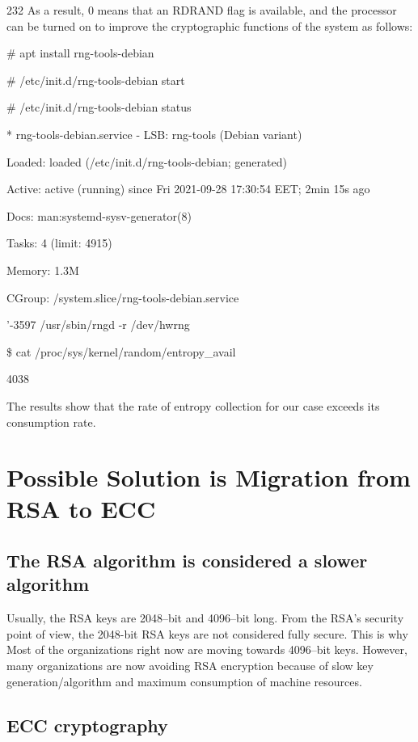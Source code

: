 \documentclass[runningheads]{llncs}
\begin{document}
232
As a result, 0 means that an RDRAND flag is available, and the processor can be turned on to improve the cryptographic functions of the system as follows:

\# apt install rng-tools-debian

\# /etc/init.d/rng-tools-debian start

\# /etc/init.d/rng-tools-debian status

* rng-tools-debian.service - LSB: rng-tools (Debian variant)

Loaded: loaded (/etc/init.d/rng-tools-debian; generated)

Active: active (running) since Fri 2021-09-28 17:30:54 EET; 2min 15s ago

Docs: man:systemd-sysv-generator(8)

Tasks: 4 (limit: 4915)

Memory: 1.3M

CGroup: /system.slice/rng-tools-debian.service

'-3597 /usr/sbin/rngd -r /dev/hwrng

\$ cat /proc/sys/kernel/random/entropy\_avail

4038

The results show that the rate of entropy collection for our case exceeds its consumption rate.

\section{Possible Solution is Migration from RSA to ECC}
\label{sec:6}

\subsection{The RSA algorithm is considered a slower algorithm}
\label{sub-sec:6-1}

Usually, the RSA keys are 2048–bit and 4096–bit long. From the RSA's security point of view, the 2048-bit RSA keys are not considered fully secure. This is why Most of the organizations right now are moving towards 4096–bit keys. However, many organizations are now avoiding RSA encryption because of slow key generation/algorithm and maximum consumption of machine resources.

\subsection{ECC cryptography}
\label{sub-sec:6-2}
\end{document}
